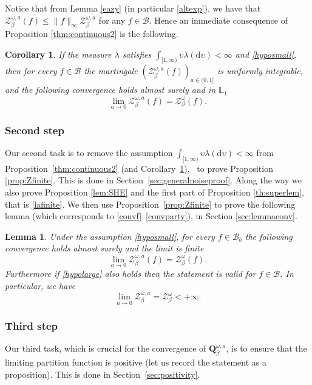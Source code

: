 \documentclass[JEP,XML,SOM,Unicode,published]{cedram}
\let\mathcal\mathscr
\newtheorem{lemma}[theorem]{Lemma}
\newtheorem{cor}[theorem]{Corollary}
\theoremstyle{definition}
\newcommand{\dd}{\mathrm{d}}
\newcommand{\cB}{{\ensuremath{\mathcal B}} }
\newcommand{\cZ}{{\ensuremath{\mathcal Z}} }
\newcommand{\bQ}{{\ensuremath{\mathbf Q}} }
\newcommand{\bbL}{{\ensuremath{\mathbb L}} }
\let\gl\lambda
\let\ups\upsilon
\let\go\omega
\begin{document}
 Notice that from Lemma \ref{eazy} (in particular \eqref{altexp}),
we have that
$\cZ^{\go,a }_{\beta}(f)\le \|f\|_{\infty} \cZ^{\go,a }_{\beta}$ for any $f\in \cB$. Hence an immediate consequence of
Proposition \ref{thm:continuous2} is the following.

\begin{cor}\label{toutlesf}
If the measure $\gl$ satisfies $\int_{[1,\infty)} \ups \gl(\dd \ups)<\infty$ and \eqref{hyposmall}, then for every $f\in \cB$ the martingale
$(\cZ^{\go,a }_{\beta}(f))_{a\in(0,1]}$ is uniformly integrable, and
the following convergence holds almost surely and in $\bbL_1$
\begin{equation*}
\lim_{a \to 0}\cZ^{\go,a }_{\beta}(f)=\cZ^{\go }_{ \beta}(f).
\end{equation*}
\end{cor}

\subsubsection*{Second step} Our second task is to remove the assumption $\int_{[1,\infty)} \ups \gl(\dd \ups)<\infty$ from Proposition~\ref{thm:continuous2} (and Corollary~\ref{toutlesf}), \ie \ to prove Proposition \ref{prop:Zfinite}. This is done in Section~\ref{sec:generalnoiseproof}. Along the way we also prove Proposition \ref{lem:SHE} and the first part of Proposition \ref{th:superlem}, that is \eqref{lafinite}.
We then use Proposition~\ref{prop:Zfinite} to prove the following lemma (which corresponds to \eqref{convf}--\eqref{convparty}), in Section \ref{sec:lemmaconv}.

\begin{lemma}\label{lemmaconv}
Under the assumption \eqref{hyposmall}, for every $f\in \cB_b$
the following convergence holds almost surely and the limit is finite
\begin{equation*}
\lim_{a \to 0}\cZ^{\go,a }_{\beta}(f)=\cZ^{\go }_{ \beta}(f).
\end{equation*}
Furthermore if \eqref{hypolarge} also holds then the statement is valid for $f\in \mathcal B$. In particular, we have
\begin{equation}
\label{eq:lemmaconv}
\lim_{a \to 0}\cZ^{\go,a }_{\beta}=\cZ^{\go }_{ \beta} <+\infty.
\end{equation}
\end{lemma}

\subsubsection*{Third step} Our third task, which is crucial for the convergence of $\bQ^{\go,a}_{\beta}$, is to ensure that the limiting partition function is positive (let us record the statement as a proposition).
This is done in Section~\ref{sec:positivity}.
\end{document}
